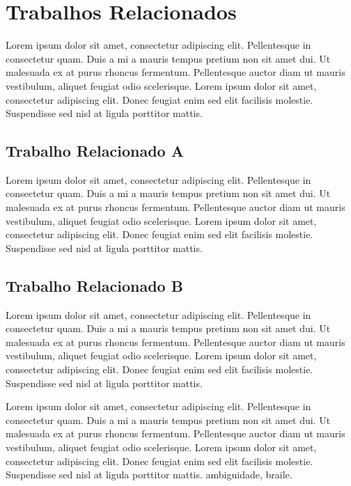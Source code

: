 \chapter{Trabalhos Relacionados}
\label{cap:trabalhos-relacionados}

Lorem ipsum dolor sit amet, consectetur adipiscing elit. Pellentesque in consectetur quam. Duis a mi a mauris tempus pretium non sit amet dui. Ut malesuada ex at purus rhoncus fermentum. Pellentesque auctor diam ut mauris vestibulum, aliquet feugiat odio scelerisque. Lorem ipsum dolor sit amet, consectetur adipiscing elit. Donec feugiat enim sed elit facilisis molestie. Suspendisse sed nisl at ligula porttitor mattis.

\section{Trabalho Relacionado A}
\label{sec:trabalho-relacionado-a}

Lorem ipsum dolor sit amet, consectetur adipiscing elit. Pellentesque in consectetur quam. Duis a mi a mauris tempus pretium non sit amet dui. Ut malesuada ex at purus rhoncus fermentum. Pellentesque auctor diam ut mauris vestibulum, aliquet feugiat odio scelerisque. Lorem ipsum dolor sit amet, consectetur adipiscing elit. Donec feugiat enim sed elit facilisis molestie. Suspendisse sed nisl at ligula porttitor mattis.

\section{Trabalho Relacionado B}
\label{sec:trabalho-relacionado-b}

Lorem ipsum dolor sit amet, consectetur adipiscing elit. Pellentesque in consectetur quam. Duis a mi a mauris tempus pretium non sit amet dui. Ut malesuada ex at purus rhoncus fermentum. Pellentesque auctor diam ut mauris vestibulum, aliquet feugiat odio scelerisque. Lorem ipsum dolor sit amet, consectetur adipiscing elit. Donec feugiat enim sed elit facilisis molestie. Suspendisse sed nisl at ligula porttitor mattis.

	\begin{quadro}[h!]
		\centering
	\end{quadro}

Lorem ipsum dolor sit amet, consectetur adipiscing elit. Pellentesque in consectetur quam. Duis a mi a mauris tempus pretium non sit amet dui. Ut malesuada ex at purus rhoncus fermentum. Pellentesque auctor diam ut mauris vestibulum, aliquet feugiat odio scelerisque. Lorem ipsum dolor sit amet, consectetur adipiscing elit. Donec feugiat enim sed elit facilisis molestie. Suspendisse sed nisl at ligula porttitor mattis. \gls{ambiguidade}, \gls{braile}.
